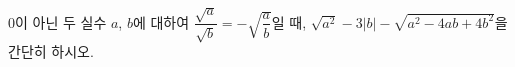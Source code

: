 $0$이 아닌 두 실수 $a$, $b$에 대하여 $\dfrac{\sqrt{a}}{\sqrt{b}}=-\sqrt{\dfrac{a}{b}}$일 때, $\sqrt{a^2}-3|b|-\sqrt{a^2-4ab+4b^2}$을 간단히 하시오.

